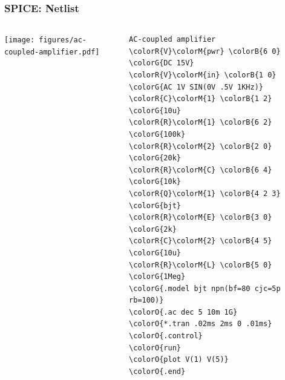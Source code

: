 \begin{frame}[fragile]
  \frametitle{SPICE: Netlist}
  \begin{columns}
    \begin{column}{.5\textwidth}
      \begin{center}
        \texttt{[image: figures/ac-coupled-amplifier.pdf]}
      \end{center}
    \end{column}
    \begin{column}{.5\textwidth}
      \footnotesize
      \begin{Verbatim}[commandchars=\\\{\}]
AC-coupled amplifier
\colorR{V}\colorM{pwr} \colorB{6 0} \colorG{DC 15V}
\colorR{V}\colorM{in} \colorB{1 0} \colorG{AC 1V SIN(0V .5V 1KHz)}
\colorR{C}\colorM{1} \colorB{1 2} \colorG{10u}
\colorR{R}\colorM{1} \colorB{6 2} \colorG{100k}
\colorR{R}\colorM{2} \colorB{2 0} \colorG{20k}
\colorR{R}\colorM{C} \colorB{6 4} \colorG{10k}
\colorR{Q}\colorM{1} \colorB{4 2 3} \colorG{bjt}
\colorR{R}\colorM{E} \colorB{3 0} \colorG{2k}
\colorR{C}\colorM{2} \colorB{4 5} \colorG{10u}
\colorR{R}\colorM{L} \colorB{5 0} \colorG{1Meg}
\colorG{.model bjt npn(bf=80 cjc=5p rb=100)}
\colorO{.ac dec 5 10m 1G}
\colorO{*.tran .02ms 2ms 0 .01ms}
\colorO{.control}
\colorO{run}
\colorO{plot V(1) V(5)}
\colorO{.end}
      \end{Verbatim}
      \normalsize
    \end{column}
  \end{columns}
\end{frame}

